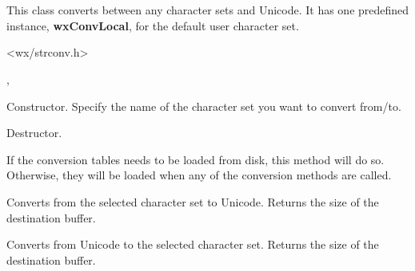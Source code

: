 %
%


\section{}\label{wxcsconv}

This class converts between any character sets and Unicode.
It has one predefined instance, {\bf wxConvLocal}, for the
default user character set.




<wx/strconv.h>


, 



\label{wxcsconvwxcsconv}


Constructor. Specify the name of the character set you want to convert
from/to.

\label{wxcsconvdtor}


Destructor.

\label{wxcsconvloadnow}


If the conversion tables needs to be loaded from disk, this method
will do so. Otherwise, they will be loaded when any of the conversion
methods are called.

\label{wxcsconvmb2wc}


Converts from the selected character set to Unicode. Returns the size of the destination buffer.

\label{wxcsconvwc2mb}


Converts from Unicode to the selected character set. Returns the size of the destination buffer.

